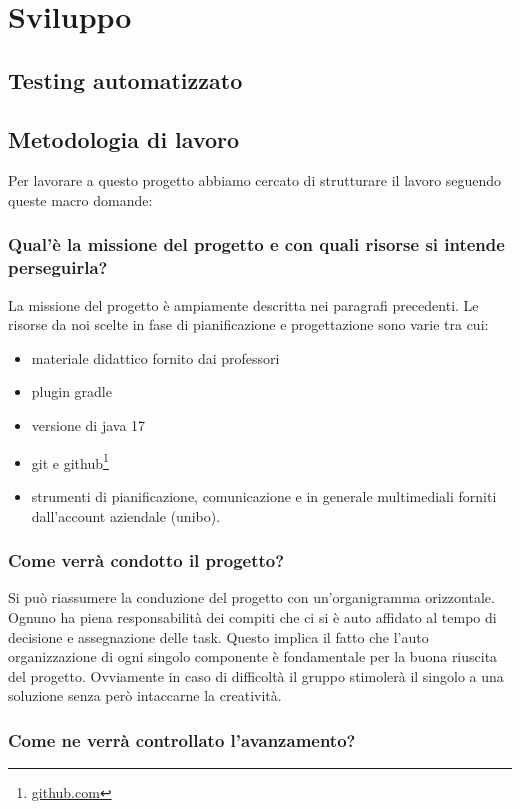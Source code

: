 \documentclass[a4paper,12pt]{report}
\begin{document}
\chapter{Sviluppo}
\section{Testing automatizzato}
\section{Metodologia di lavoro}
Per lavorare
a questo progetto abbiamo cercato di strutturare il lavoro seguendo queste macro domande:
\subsection{Qual'è la missione del progetto e con quali risorse si intende perseguirla?}
La missione del progetto è ampiamente descritta nei paragrafi precedenti.
Le risorse da noi scelte in fase di pianificazione e progettazione sono varie tra cui:
\begin{itemize}
  \item materiale didattico fornito dai professori
  \item plugin gradle
  \item versione di java 17
  \item git e github\footnote{\url{github.com}}
  \item strumenti di pianificazione, comunicazione e in generale multimediali forniti dall'account aziendale (unibo).
\end{itemize}

\subsection{Come verrà condotto il progetto?}
Si può riassumere la conduzione del progetto con un'organigramma orizzontale.
Ognuno ha piena responsabilità dei compiti che ci si è auto affidato al tempo di decisione e assegnazione delle task.
Questo implica il fatto che l'auto organizzazione di ogni singolo componente è fondamentale per la buona riuscita del progetto.
Ovviamente in caso di difficoltà il gruppo stimolerà il singolo a una soluzione senza però intaccarne la creatività.
\subsection{Come ne verrà controllato l'avanzamento?}
\end{document}
